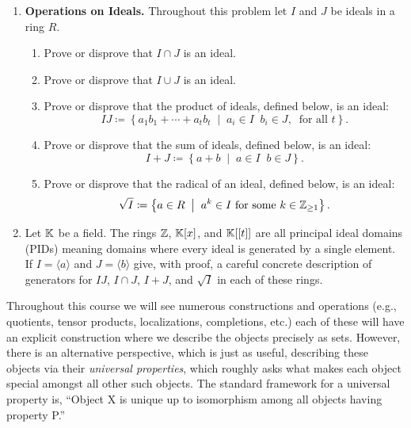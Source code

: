 \documentclass[12pt,reqno]{amsart}
\begin{document}
\begin{enumerate}[leftmargin=*]
	\item \textbf{Operations on Ideals.} Throughout this problem let $I$ and $J$ be ideals in a ring $R$.
	\begin{enumerate}[label=(\alph*),ref=\theenumi\alph*]
		\item Prove or disprove that $I \cap J$ is an ideal. 
		\item Prove or disprove that $I \cup J$ is an ideal.
		\item Prove or disprove that the product of ideals, defined below, is an ideal:
		\[
		IJ \coloneqq \left\{ a_1b_1+\cdots+a_tb_t\;\; \big| \;\; a_i\in I\;\; b_i \in J, \; \; \text{for all $t$}\right\}.
		\]
		\item Prove or disprove that the sum of ideals, defined below, is an ideal:
		\[
		I + J \coloneqq \left\{ a + b \;\; \big| \;\; a \in I\;\; b \in J\right\}.
		\]
		\item Prove or disprove that the radical of an ideal, defined below, is an ideal:
		\[
		\sqrt{I} \coloneqq \left\{ a \in R \;\; \big| \;\; a^{k} \in I \text{ for some $k\in \mathbb{Z}_{\geq1}$} \right\}.
		\]
	\end{enumerate}

	
\item Let $\mathbb{K}$ be a field. The rings $\mathbb{Z}$, $\mathbb{K}[x]$, and $\mathbb{K}[[t]]$ are all principal ideal domains (PIDs) meaning domains where every ideal is generated by a single element. If $I= \langle a \rangle$ and $J = \langle b \rangle$ give, with proof, a careful concrete description of generators for $IJ$, $I\cap J$, $I+J$, and $\sqrt{I}$ in each of these rings.

\end{enumerate}

\hrulefill

Throughout this course we will see numerous constructions and operations (e.g., quotients, tensor products, localizations, completions, etc.) each of these will have an explicit construction where we describe the objects precisely as sets. However, there is an alternative perspective, which is just as useful, describing these objects via their \emph{universal properties}, which roughly asks what makes each object special amongst all other such objects. The standard framework for a universal property is, ``Object X is unique up to isomorphism among all objects having property P.''

\hrulefill
\end{document}
